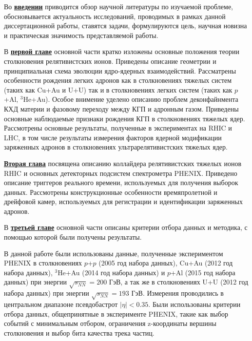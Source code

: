 Во \underline{\textbf{введении}} приводится обзор научной литературы по изучаемой проблеме, обосновывается актуальность исследований, проводимых в рамках данной диссертационной работы, ставятся задачи, формулируются цель, научная новизна и практическая значимость представляемой работы.

В \underline{\textbf{первой главе}} основной части кратко изложены основные положения теории столкновения релятивистских ионов.  Приведены описание геометрии и принципиальная схема эволюции ядро-ядерных взаимодействий. Рассматрены особенности рождения легких адронов как в столкновениях тяжелых систем (таких как Cu+Au и U+U) так и в столкновениях легких систем (таких как $p$+Al, $^{3}$He+Au). Особое внимение уделено описанию проблем деконфайнмента КХД материи и фазовому переходу между КГП и адронным газом. Приведены основные наблюдаемые признаки рождения КГП в столкновениях тяжелых ядер. Рассмотрены основные результаты, полученные в экспериментах на RHIC и LHC, в том числе результаты измерения факторов ядерной модификации заряженных адронов в столкновениях ультрарелятивистских тяжелых ядер.

\underline{\textbf{Вторая глава}} посвящена описанию коллайдера релятивистских тяжелых ионов RHIC и основных детекторных подсистем спектрометра PHENIX. Приведено описание триггеров реального времени, используемых для получения выборок данных. Рассмотрены конструкционные особенности времяпролетной и дрейфовой камер, используемых для регистрации и идентификации заряженных адронов.

В \underline{\textbf{третьей главе}} основной части описаны критерии отбора данных и методика, с помощью которой были получены результаты.

В данной работе были использованы данные, полученные экспериментом PHENIX в столкновениях $p$+$p$ (2005 год набора данных), Cu+Au (2012 год набора данных), $^{3}$He+Au (2014 год набора данных) и $p$+Al (2015 год набора данных) при энергии $\sqrt{s_{NN}}=200$ ГэВ, а так же в столкновениях U+U (2012 год набора данных) при энергии $\sqrt{s_{NN}}=193$ ГэВ. Измерения проводились в центральном диапазоне псевдобастрот $|\eta|<0.35$.
Были использованы критерии отбора данных, общепринятные в эксперименте PHENIX, такие как выбор событий с минимальным отбором, ограничения z-координаты вершины столкновения и выбор бита качества трека частиц. 


